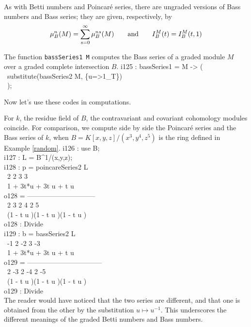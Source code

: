 As with Betti numbers and Poincar\'e series, there are ungraded versions
of Bass numbers and Bass series; they are given, respectively, by
\[
\mu_B^n(M)=\sum_{s=0}^\infty\mu_B^{ns}(M)
\qquad\text{and}\qquad
{I}_B^M(t)={I}_B^M(t,1)
\]

\begin{sCode}
The function {\tt bassSeries1 M} computes the Bass series of a graded
module $M$ over a graded complete intersection $B$.
\beginOutput
i125 : bassSeries1 = M -> (\\
\          substitute(bassSeries2 M, \{u=>1_T\})\\
\          );\\
\endOutput
\end{sCode}

Now let's use these codes in computations.

\begin{sExample}
For $k$, the residue field of $B$, the contravariant and covariant
cohomology modules coincide.  For comparison, we compute side by side
the Poincar\'e series and the Bass series of $k$, when
$B=K[x,y,z]/(x^3,y^4,z^5)$ is the ring defined in Example
\ref{random}.
\beginOutput
i126 : use B;\\
\endOutput
\beginOutput
i127 : L = B^1/(x,y,z);\\
\endOutput
\beginOutput
i128 : p = poincareSeries2 L\\
\emptyLine
\                        2 2    3 3\\
\           1 + 3t*u + 3t u  + t u\\
o128 = ------------------------------\\
\             2 3       2 4       2 5\\
\       (1 - t u )(1 - t u )(1 - t u )\\
\emptyLine
o128 : Divide\\
\endOutput
\beginOutput
i129 : b = bassSeries2 L\\
\emptyLine
\                  -1     2 -2    3 -3\\
\          1 + 3t*u   + 3t u   + t u\\
o129 = ---------------------------------\\
\             2 -3       2 -4       2 -5\\
\       (1 - t u  )(1 - t u  )(1 - t u  )\\
\emptyLine
o129 : Divide\\
\endOutput
The reader would have noticed that the two series are different, and
that one is obtained from the other by the substitution $u\mapsto
u^{-1}$.  This underscores the different meanings of the graded Betti
numbers and Bass numbers.
 \end{sExample}

